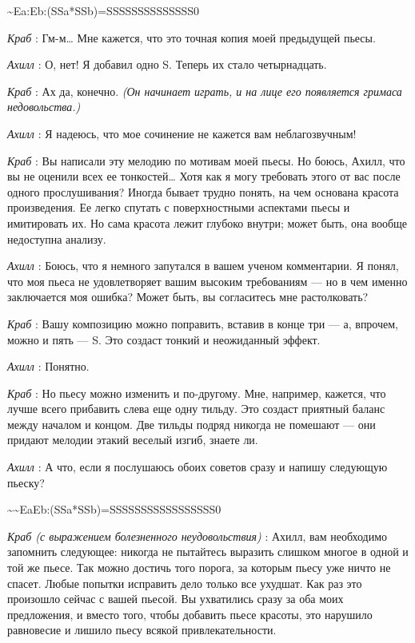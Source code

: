 \documentclass[../main.tex]{subfiles}
\begin{document}
\begin{dialogue}
\textasciitilde Ea:Eb:(SSa*SSb)=SSSSSSSSSSSSSS0

\emph{Краб} : Гм-м\ldots{} Мне кажется, что это точная копия моей предыдущей пьесы.

\emph{Ахилл} : О, нет! Я добавил одно S. Теперь их стало четырнадцать.

\emph{Краб} : Ах да, конечно. \emph{(Он начинает играть, и на лице его появляется гримаса недовольства.)}

\emph{Ахилл} : Я надеюсь, что мое сочинение не кажется вам неблагозвучным!

\emph{Краб} : Вы написали эту мелодию по мотивам моей пьесы. Но боюсь, Ахилл, что вы не оценили всех ее тонкостей\ldots{} Хотя как я могу требовать этого от вас после одного прослушивания? Иногда бывает трудно понять, на чем основана красота произведения. Ее легко спутать с поверхностными аспектами пьесы и имитировать их. Но сама красота лежит глубоко внутри; может быть, она вообще недоступна анализу.

\emph{Ахилл} : Боюсь, что я немного запутался в вашем ученом комментарии. Я понял, что моя пьеса не удовлетворяет вашим высоким требованиям --- но в чем именно заключается моя ошибка? Может быть, вы согласитесь мне растолковать?

\emph{Краб} : Вашу композицию можно поправить, вставив в конце три --- а, впрочем, можно и пять --- S. Это создаст тонкий и неожиданный эффект.

\emph{Ахилл} : Понятно.

\emph{Краб} : Но пьесу можно изменить и по-другому. Мне, например, кажется, что лучше всего прибавить слева еще одну тильду. Это создаст приятный баланс между началом и концом. Две тильды подряд никогда не помешают --- они придают мелодии этакий веселый изгиб, знаете ли.

\emph{Ахилл} : А что, если я послушаюсь обоих советов сразу и напишу следующую пьеску?

\textasciitilde\textasciitilde EaEb:(SSa*SSb)=SSSSSSSSSSSSSSSSS0

\emph{Краб (с выражением болезненного неудовольствия)} : Ахилл, вам необходимо запомнить следующее: никогда не пытайтесь выразить слишком многое в одной и той же пьесе. Так можно достичь того порога, за которым пьесу уже ничто не спасет. Любые попытки исправить дело только все ухудшат. Как раз это произошло сейчас с вашей пьесой. Вы ухватились сразу за оба моих предложения, и вместо того, чтобы добавить пьесе красоты, это нарушило равновесие и лишило пьесу всякой привлекательности.


\end{dialogue}
\end{document}

